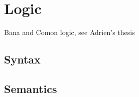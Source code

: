 \section{Logic}

Bana and Comon logic, see Adrien's thesis

\subsection{Syntax}


%
%

\subsection{Semantics}

